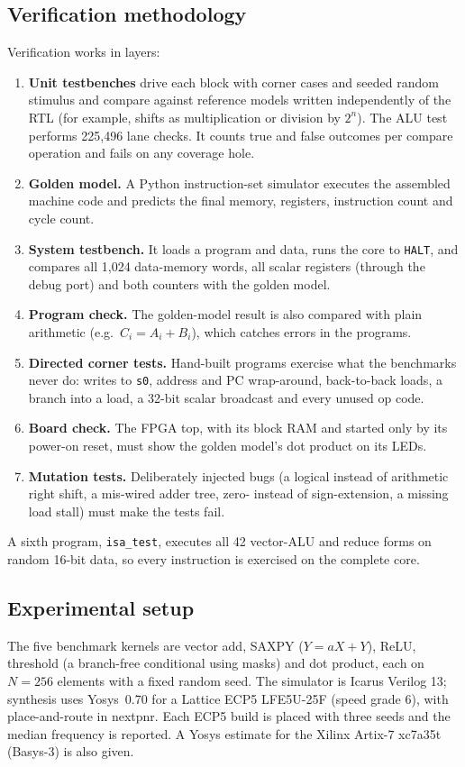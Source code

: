 \documentclass[conference]{IEEEtran}
\begin{document}
\subsection{Verification methodology}\label{sec:verif}
Verification works in layers:
\begin{enumerate}
\item \textbf{Unit testbenches} drive each block with corner cases and seeded random
      stimulus and compare against reference models written independently of the RTL
      (for example, shifts as multiplication or division by $2^n$). The ALU test
      performs 225,496 lane checks. It counts true and false outcomes per compare
      operation and fails on any coverage hole.
\item \textbf{Golden model.} A Python instruction-set simulator executes the
      assembled machine code and predicts the final memory, registers, instruction
      count and cycle count.
\item \textbf{System testbench.} It loads a program and data, runs the core to
      \texttt{HALT}, and compares all 1,024 data-memory words, all scalar registers
      (through the debug port) and both counters with the golden model.
\item \textbf{Program check.} The golden-model result is also compared with plain
      arithmetic (e.g.\ $C_i = A_i + B_i$), which catches errors in the programs.
\item \textbf{Directed corner tests.} Hand-built programs exercise what the
      benchmarks never do: writes to \texttt{s0}, address and PC wrap-around,
      back-to-back loads, a branch into a load, a 32-bit scalar broadcast and
      every unused op code.
\item \textbf{Board check.} The FPGA top, with its block RAM and started only by
      its power-on reset, must show the golden model's dot product on its LEDs.
\item \textbf{Mutation tests.} Deliberately injected bugs (a logical instead of
      arithmetic right shift, a mis-wired adder tree, zero- instead of
      sign-extension, a missing load stall) must make the tests fail.
\end{enumerate}
A sixth program, \texttt{isa\_test}, executes all 42 vector-ALU and reduce forms on
random 16-bit data, so every instruction is exercised on the complete core.

\subsection{Experimental setup}
The five benchmark kernels are vector add, SAXPY ($Y = aX + Y$), ReLU, threshold
(a branch-free conditional using masks) and dot product, each on $N = 256$
elements with a fixed random seed. The simulator is Icarus Verilog 13; synthesis
uses Yosys~0.70 for a Lattice ECP5 LFE5U-25F (speed grade 6), with place-and-route
in nextpnr. Each ECP5 build is placed with three seeds and the median frequency is
reported. A Yosys estimate for the Xilinx Artix-7 xc7a35t (Basys-3) is also given.
\end{document}

